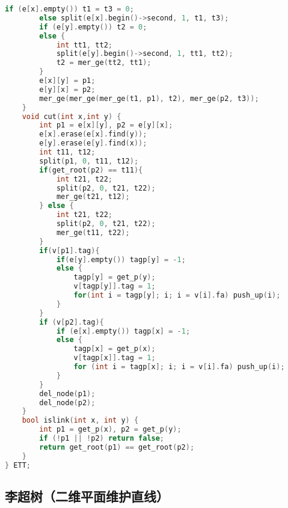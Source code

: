 \begin{lstlisting}[language=C++]
        if (e[x].empty()) t1 = t3 = 0;
        else split(e[x].begin()->second, 1, t1, t3);
        if (e[y].empty()) t2 = 0;
        else {
            int tt1, tt2;
            split(e[y].begin()->second, 1, tt1, tt2);
            t2 = mer_ge(tt2, tt1);
        }
        e[x][y] = p1;
        e[y][x] = p2;
        mer_ge(mer_ge(mer_ge(t1, p1), t2), mer_ge(p2, t3));
    }
    void cut(int x,int y) {
        int p1 = e[x][y], p2 = e[y][x];
        e[x].erase(e[x].find(y));
        e[y].erase(e[y].find(x));
        int t11, t12;
        split(p1, 0, t11, t12);
        if(get_root(p2) == t11){
            int t21, t22;
            split(p2, 0, t21, t22);
            mer_ge(t21, t12);
        } else {
            int t21, t22;
            split(p2, 0, t21, t22);
            mer_ge(t11, t22);
        }
        if(v[p1].tag){
            if(e[y].empty()) tagp[y] = -1;
            else {
                tagp[y] = get_p(y);
                v[tagp[y]].tag = 1;
                for(int i = tagp[y]; i; i = v[i].fa) push_up(i);
            }
        }
        if (v[p2].tag){
            if (e[x].empty()) tagp[x] = -1;
            else {
                tagp[x] = get_p(x);
                v[tagp[x]].tag = 1;
                for (int i = tagp[x]; i; i = v[i].fa) push_up(i);
            }
        }
        del_node(p1);
        del_node(p2);
    }
    bool islink(int x, int y) {
        int p1 = get_p(x), p2 = get_p(y);
        if (!p1 || !p2) return false;
        return get_root(p1) == get_root(p2);
    }
} ETT;
\end{lstlisting}

\subsection{李超树（二维平面维护直线）}

